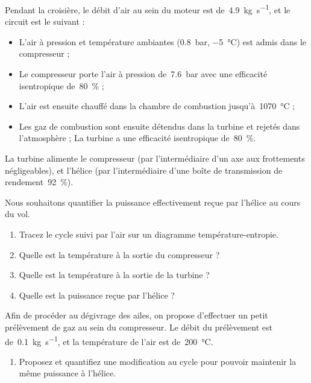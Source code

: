 	Pendant la croisière, le débit d’air au sein du moteur est de~\SI{4,9}{\kilogram\per\second}, et le circuit est le suivant :
	\begin{itemize}
		\item L’air à pression et température ambiantes (\SI{0,8}{\bar}, \SI{-5}{\degreeCelsius}) est admis dans le compresseur ;
		\item Le compresseur porte l’air à pression de~\SI{7,6}{\bar} avec une efficacité isentropique de~\SI{80}{\percent} ;
		\item L’air est ensuite chauffé dans la chambre de combustion jusqu’à~\SI{1070}{\degreeCelsius} ;
		\item Les gaz de combustion sont ensuite détendus dans la turbine et rejetés dans l’atmosphère ; La turbine a une efficacité isentropique de~\SI{80}{\percent}.
	\end{itemize}
	
	 La turbine alimente le compresseur (par l’intermédiaire d’un axe aux frottements négligeables), et l’hélice (par l’intermédiaire d’une boîte de transmission de rendement~\SI{92}{\percent}).
	
	Nous souhaitons quantifier la puissance effectivement reçue par l’hélice au cours du vol.
	
	\begin{enumerate}
		\item Tracez le cycle suivi par l’air sur un diagramme température-entropie.
		\item Quelle est la température à la sortie du compresseur ?
		\item Quelle est la température à la sortie de la turbine ?
		\item Quelle est la puissance reçue par l’hélice ?
	\end{enumerate}

	Afin de procéder au dégivrage des ailes, on propose d’effectuer un petit prélèvement de gaz au sein du compresseur. Le débit du prélèvement est de~\SI{0,1}{\kilogram\per\second}, et la température de l’air est de~\SI{200}{\degreeCelsius}.
	
	\begin{enumerate}
		\item Proposez et quantifiez une modification au cycle pour pouvoir maintenir la même puissance à l’hélice.
	\end{enumerate}
	
